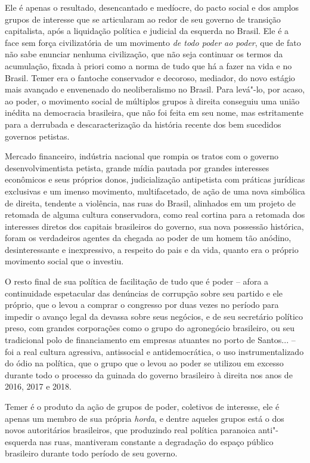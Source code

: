 Ele é apenas o resultado, desencantado e medíocre, do pacto social e dos
amplos grupos de interesse que se articularam ao redor de seu governo de
transição capitalista, após a liquidação política e judicial da esquerda
no Brasil. Ele é a face sem força civilizatória de um movimento \emph{de
todo poder ao poder}, que de fato não sabe enunciar nenhuma civilização,
que não seja continuar os termos da acumulação, fixada à priori como a
norma de tudo que há a fazer na vida e no Brasil. Temer era o fantoche
conservador e decoroso, mediador, do novo estágio mais avançado e
envenenado do neoliberalismo no Brasil. Para levá"-lo, por acaso, ao
poder, o movimento social de múltiplos grupos à direita conseguiu uma
união inédita na democracia brasileira, que não foi feita em seu nome,
mas estritamente para a derrubada e descaracterização da história
recente dos bem sucedidos governos petistas.

Mercado financeiro, indústria nacional que rompia os tratos com o
governo desenvolvimentista petista, grande mídia pautada por grandes
interesses econômicos e seus próprios donos, judicialização antipetista
com práticas jurídicas exclusivas e um imenso movimento, multifacetado,
de ação de uma nova simbólica de direita, tendente a violência, nas ruas
do Brasil, alinhados em um projeto de retomada de alguma cultura
conservadora, como real cortina para a retomada dos interesses diretos
dos capitais brasileiros do governo, sua nova possessão histórica, foram
os verdadeiros agentes da chegada ao poder de um homem tão anódino,
desinteressante e inexpressivo, a respeito do pais e da vida, quanto era
o próprio movimento social que o investiu.

O resto final de sua política de facilitação de tudo que é poder --
afora a continuidade espetacular das denúncias de corrupção sobre seu
partido e ele próprio, que o levou a comprar o congresso por duas vezes
no período para impedir o avanço legal da devassa sobre seus negócios, e
de seu secretário político preso, com grandes corporações como o grupo
 do agronegócio brasileiro, ou seu tradicional polo de financiamento
em empresas atuantes no porto de Santos... -- foi a real cultura
agressiva, antissocial e antidemocrática, o uso instrumentalizado do
ódio na política, que o grupo que o levou ao poder se utilizou em
excesso durante todo o processo da guinada do governo brasileiro à
direita nos anos de 2016, 2017 e 2018.

Temer é o produto da ação de grupos de poder, coletivos de interesse,
ele é apenas um membro de sua própria \emph{horda}, e dentre aqueles
grupos está o dos novos autoritários brasileiros, que produzindo real
política paranoica anti"-esquerda nas ruas, mantiveram constante a
degradação do espaço público brasileiro durante todo período de seu
governo.

